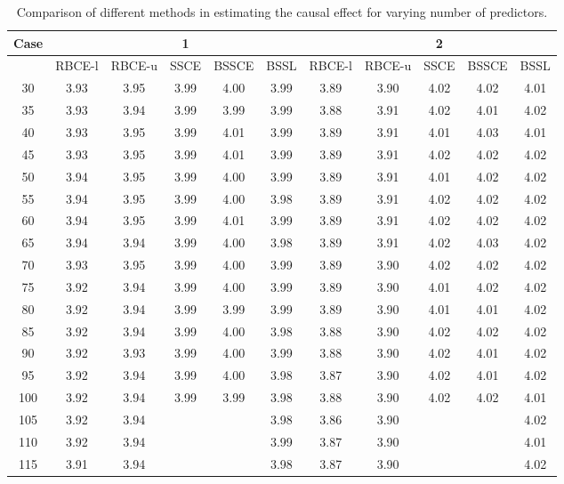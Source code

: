 \documentclass[preprint,12pt]{elsarticle}
\begin{document}
\begin{table}[ht]
\centering
\tiny
\caption{Comparison of different methods in estimating the causal effect for varying number of predictors.}
\begin{tabular}{c|ccccc|ccccc}
  \hline
 Case&  &  & 1 &  &  &  &  & 2 &  &  \\ 
  \hline
 & RBCE-l & RBCE-u & SSCE & BSSCE & BSSL & RBCE-l & RBCE-u & SSCE & BSSCE & BSSL \\ 
  \hline
\hline
30 & 3.93 & 3.95 & 3.99 & 4.00 & 3.99 & 3.89 & 3.90 & 4.02 & 4.02 & 4.01 \\ 
  35 & 3.93 & 3.94 & 3.99 & 3.99 & 3.99 & 3.88 & 3.91 & 4.02 & 4.01 & 4.02 \\ 
  40 & 3.93 & 3.95 & 3.99 & 4.01 & 3.99 & 3.89 & 3.91 & 4.01 & 4.03 & 4.01 \\ 
  45 & 3.93 & 3.95 & 3.99 & 4.01 & 3.99 & 3.89 & 3.91 & 4.02 & 4.02 & 4.02 \\ 
  50 & 3.94 & 3.95 & 3.99 & 4.00 & 3.99 & 3.89 & 3.91 & 4.01 & 4.02 & 4.02 \\ 
  55 & 3.94 & 3.95 & 3.99 & 4.00 & 3.98 & 3.89 & 3.91 & 4.02 & 4.02 & 4.02 \\ 
  60 & 3.94 & 3.95 & 3.99 & 4.01 & 3.99 & 3.89 & 3.91 & 4.02 & 4.02 & 4.02 \\ 
  65 & 3.94 & 3.94 & 3.99 & 4.00 & 3.98 & 3.89 & 3.91 & 4.02 & 4.03 & 4.02 \\ 
  70 & 3.93 & 3.95 & 3.99 & 4.00 & 3.99 & 3.89 & 3.90 & 4.02 & 4.02 & 4.02 \\ 
  75 & 3.92 & 3.94 & 3.99 & 4.00 & 3.99 & 3.89 & 3.90 & 4.01 & 4.02 & 4.02 \\ 
  80 & 3.92 & 3.94 & 3.99 & 3.99 & 3.99 & 3.89 & 3.90 & 4.01 & 4.01 & 4.02 \\ 
  85 & 3.92 & 3.94 & 3.99 & 4.00 & 3.98 & 3.88 & 3.90 & 4.02 & 4.02 & 4.02 \\ 
  90 & 3.92 & 3.93 & 3.99 & 4.00 & 3.99 & 3.88 & 3.90 & 4.02 & 4.01 & 4.02 \\ 
  95 & 3.92 & 3.94 & 3.99 & 4.00 & 3.98 & 3.87 & 3.90 & 4.02 & 4.01 & 4.02 \\ 
  100 & 3.92 & 3.94 & 3.99 & 3.99 & 3.98 & 3.88 & 3.90 & 4.02 & 4.02 & 4.01 \\ 
  105 & 3.92 & 3.94 &  &  & 3.98 & 3.86 & 3.90 &  &  & 4.02 \\ 
  110 & 3.92 & 3.94 &  &  & 3.99 & 3.87 & 3.90 &  &  & 4.01 \\ 
  115 & 3.91 & 3.94 &  &  & 3.98 & 3.87 & 3.90 &  &  & 4.02 \\ 

\end{tabular}
\end{table}
\end{document}

